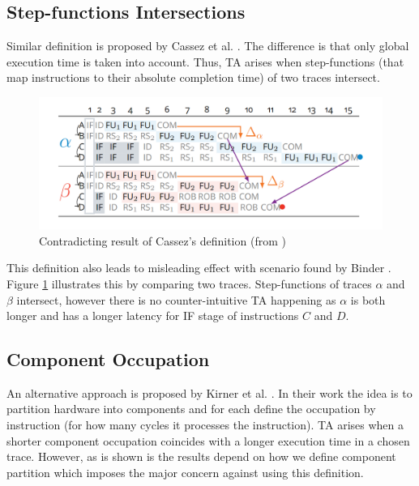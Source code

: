 \subsection{Step-functions Intersections}

Similar definition is proposed by Cassez et al. \cite{cassez_what_2012}. The difference is that only global execution time is taken into account. Thus, TA arises when step-functions (that map instructions to their absolute completion time) of two traces intersect. 

\begin{figure}[!htb]
    \centering
    \includegraphics[width=\textwidth]{figures/step-func-2-bad.png}
    \caption{Contradicting result of Cassez's definition (from \cite{binder_definitions_2022})}
    \label{fig:step-2}
\end{figure}

This definition also leads to misleading effect with scenario found by Binder \cite{binder_definitions_2022}. Figure \ref{fig:step-2} illustrates this by comparing two traces. Step-functions of traces $\alpha$ and $\beta$ intersect, however there is no counter-intuitive TA happening as $\alpha$ is both longer and has a  longer latency for IF stage of instructions $C$ and $D$.

\subsection{Component Occupation}

An alternative approach is proposed by Kirner et al. \cite{kirner_precise_2009}. In their work the idea is to partition hardware into components and for each define the occupation by instruction (for how many cycles it processes the instruction). TA arises when a shorter component occupation coincides with a longer execution time in a chosen trace. However, as is shown is \cite{binder_definitions_2022} the results depend on how we define component partition which imposes the major concern against using this definition.

